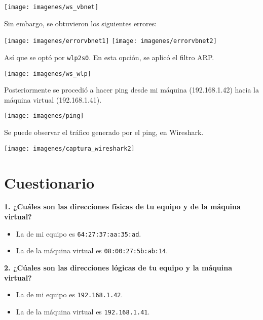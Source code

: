 \documentclass{article}
\begin{document}
\begin{center}
\texttt{[image: imagenes/ws\_vbnet]}
\end{center}

Sin embargo, se obtuvieron los siguientes errores:

\begin{center}
\texttt{[image: imagenes/errorvbnet1]}
\texttt{[image: imagenes/errorvbnet2]}
\end{center}

Así que se optó por \texttt{wlp2s0}. En esta opción, se aplicó el filtro ARP.

\begin{center}
\texttt{[image: imagenes/ws\_wlp]}
\end{center}

Posteriormente se procedió a hacer ping desde mi máquina (192.168.1.42) hacia la máquina virtual (192.168.1.41).

\begin{center}
\texttt{[image: imagenes/ping]}
\end{center}

Se puede observar el tráfico generado por el ping, en Wireshark.

\begin{center}
\texttt{[image: imagenes/captura\_wireshark2]}
\end{center}

\section{Cuestionario}

\textbf{1. ¿Cuáles son las direcciones físicas de tu equipo y de la máquina virtual?}

\begin{itemize}
\item La de mi equipo es \texttt{64:27:37:aa:35:ad}.
\item La de la máquina virtual es \texttt{08:00:27:5b:ab:14}.
\end{itemize}

\textbf{2. ¿Cúales son las direcciones lógicas de tu equipo y la máquina virtual?}

\begin{itemize}
\item La de mi equipo es \texttt{192.168.1.42}.
\item La de la máquina virtual es \texttt{192.168.1.41}.
\end{itemize}
\end{document}
